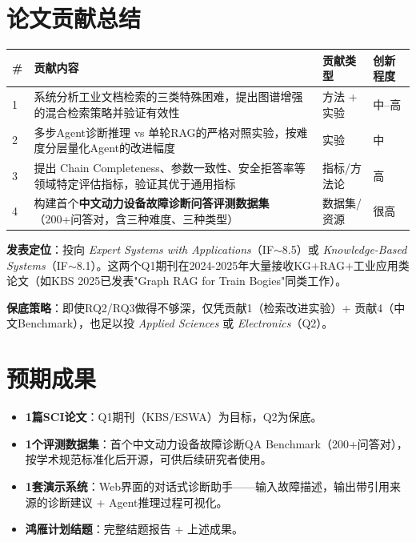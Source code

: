 \documentclass[a4paper, 11pt]{ctexart}
\begin{document}
\section{论文贡献总结}

\begin{table}[H]
\centering
\renewcommand{\arraystretch}{1.3}
\small
\begin{tabular}{p{0.5cm} p{6cm} p{2.5cm} p{2.5cm}}
    \toprule
    \textbf{\#} & \textbf{贡献内容} & \textbf{贡献类型} & \textbf{创新程度} \\
    \midrule
    1 & 系统分析工业文档检索的三类特殊困难，提出图谱增强的混合检索策略并验证有效性 & 方法 + 实验 & 中--高 \\
    2 & 多步Agent诊断推理 vs 单轮RAG的严格对照实验，按难度分层量化Agent的改进幅度 & 实验 & 中 \\
    3 & 提出 Chain Completeness、参数一致性、安全拒答率等领域特定评估指标，验证其优于通用指标 & 指标/方法论 & 高 \\
    4 & 构建首个\textbf{中文动力设备故障诊断问答评测数据集}（200+问答对，含三种难度、三种类型） & 数据集/资源 & 很高 \\
    \bottomrule
\end{tabular}
\end{table}

\begin{tcolorbox}[colback=bglight, colframe=tsinghua!30, arc=2mm]
\textbf{发表定位}：投向 \textit{Expert Systems with Applications}（IF$\sim$8.5）或 \textit{Knowledge-Based Systems}（IF$\sim$8.1）。这两个Q1期刊在2024-2025年大量接收KG+RAG+工业应用类论文（如KBS 2025已发表"Graph RAG for Train Bogies"同类工作）。

\textbf{保底策略}：即使RQ2/RQ3做得不够深，仅凭贡献1（检索改进实验）+ 贡献4（中文Benchmark），也足以投 \textit{Applied Sciences} 或 \textit{Electronics}（Q2）。
\end{tcolorbox}


\section{预期成果}

\begin{itemize}
    \item \textbf{1篇SCI论文}：Q1期刊（KBS/ESWA）为目标，Q2为保底。
    \item \textbf{1个评测数据集}：首个中文动力设备故障诊断QA Benchmark（200+问答对），按学术规范标准化后开源，可供后续研究者使用。
    \item \textbf{1套演示系统}：Web界面的对话式诊断助手——输入故障描述，输出带引用来源的诊断建议 + Agent推理过程可视化。
    \item \textbf{鸿雁计划结题}：完整结题报告 + 上述成果。
\end{itemize}
\end{document}
